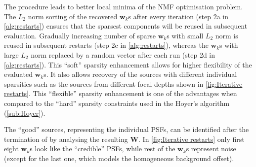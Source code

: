 The \inmf{} procedure leads to better local minima of the NMF optimisation problem. The $L_2$ norm sorting of the recovered $\bm{w}_k$s after every iteration (step 2a in \autoref{alg:restarts}) ensures that the sparsest components will be reused in subsequent evaluation. Gradually increasing number of sparse $\bm{w}_k$s with small $L_2$ norm is reused in subsequent restarts (step 2c in \autoref{alg:restarts}), whereas the $\bm{w}_k$s with large $L_2$ norm replaced by a random vector after each run (step 2d in \autoref{alg:restarts}). This ``soft'' sparsity enhancement allows for higher flexibility of the evaluated $\bm{w}_k$s. It also allows recovery of the sources with different individual sparsities such as the sources from different focal depths shown in \autoref{fig:Iterative restarts}\ddd. This ``flexible'' sparsity enhancement is one of the \inmf{} advantages when compared to the ``hard'' sparsity constraints used in the Hoyer's algorithm (\autoref{sub:Hoyer}).

The ``good'' sources, representing the individual PSFs, can be identified after the termination of \inmf{} by analysing the resulting $\bm{W}$. In \autoref{fig:Iterative restarts}\ddd{} only first eight $\bm{w}_k$s look like the ``credible'' PSFs, while rest of the $\bm{w}_k$s represent noise (except for the last one, which models the homogeneous background offset).

